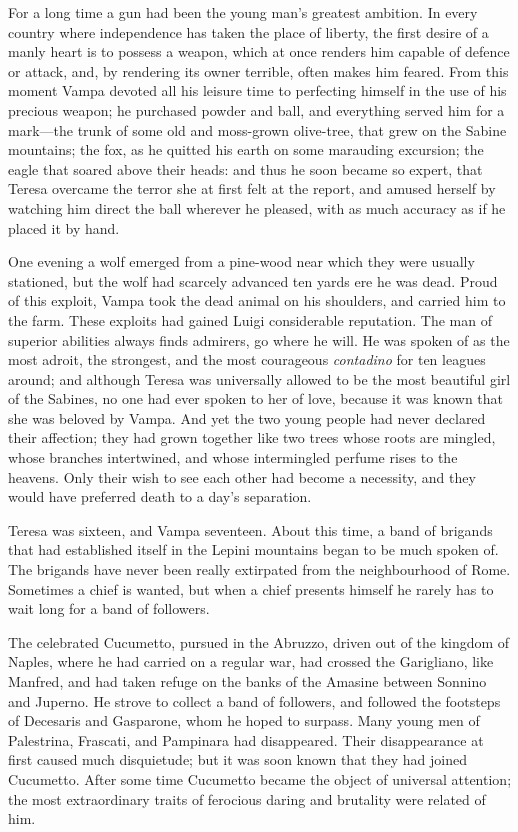 {For a long time a gun had been the young man's greatest ambition. In every country where independence has taken the place of liberty, the first desire of a manly heart is to possess a weapon, which at once renders him capable of defence or attack, and, by rendering its owner terrible, often makes him feared. From this moment Vampa devoted all his leisure time to perfecting himself in the use of his precious weapon; he purchased powder and ball, and everything served him for a mark—the trunk of some old and moss-grown olive-tree, that grew on the Sabine mountains; the fox, as he quitted his earth on some marauding excursion; the eagle that soared above their heads: and thus he soon became so expert, that Teresa overcame the terror she at first felt at the report, and amused herself by watching him direct the ball wherever he pleased, with as much accuracy as if he placed it by hand.  

One evening a wolf emerged from a pine-wood near which they were usually stationed, but the wolf had scarcely advanced ten yards ere he was dead. Proud of this exploit, Vampa took the dead animal on his shoulders, and carried him to the farm. These exploits had gained Luigi considerable reputation. The man of superior abilities always finds admirers, go where he will. He was spoken of as the most adroit, the strongest, and the most courageous \textit{contadino} for ten leagues around; and although Teresa was universally allowed to be the most beautiful girl of the Sabines, no one had ever spoken to her of love, because it was known that she was beloved by Vampa. And yet the two young people had never declared their affection; they had grown together like two trees whose roots are mingled, whose branches intertwined, and whose intermingled perfume rises to the heavens. Only their wish to see each other had become a necessity, and they would have preferred death to a day's separation. 

Teresa was sixteen, and Vampa seventeen. About this time, a band of brigands that had established itself in the Lepini mountains began to be much spoken of. The brigands have never been really extirpated from the neighbourhood of Rome. Sometimes a chief is wanted, but when a chief presents himself he rarely has to wait long for a band of followers. 

The celebrated Cucumetto, pursued in the Abruzzo, driven out of the kingdom of Naples, where he had carried on a regular war, had crossed the Garigliano, like Manfred, and had taken refuge on the banks of the Amasine between Sonnino and Juperno. He strove to collect a band of followers, and followed the footsteps of Decesaris and Gasparone, whom he hoped to surpass. Many young men of Palestrina, Frascati, and Pampinara had disappeared. Their disappearance at first caused much disquietude; but it was soon known that they had joined Cucumetto. After some time Cucumetto became the object of universal attention; the most extraordinary traits of ferocious daring and brutality were related of him. 

}
